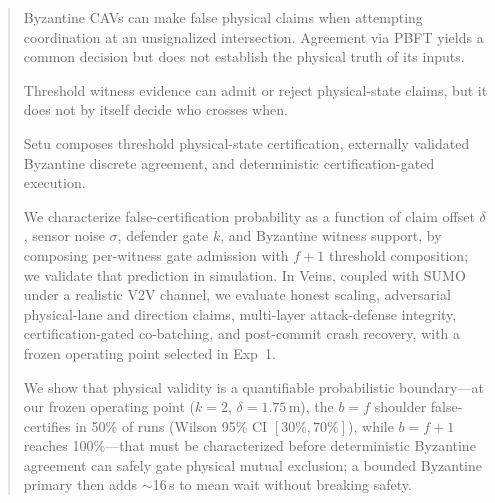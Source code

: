 \documentclass[letterpaper,10pt,conference]{IEEEtran}
\begin{document}
\begin{abstract}


Byzantine CAVs can make false physical claims when attempting coordination at an unsignalized intersection. Agreement via PBFT yields a common decision but does not
establish the physical truth of its inputs.

Threshold witness evidence can admit or reject physical-state claims,
but it does not by itself decide who crosses when.

Setu composes threshold physical-state certification, externally
validated Byzantine discrete agreement, and deterministic
certification-gated execution.

We characterize false-certification probability as a function of claim
offset $\delta$, sensor noise $\sigma$, defender gate $k$, and Byzantine
witness support, by composing per-witness gate admission with $f{+}1$
threshold composition; we validate that prediction in simulation.
In Veins, coupled with SUMO under a realistic V2V channel, we evaluate
honest scaling, adversarial physical-lane and direction claims,
multi-layer attack-defense integrity, certification-gated co-batching,
and post-commit crash recovery, with a frozen operating point selected
in Exp~1.

We show that physical validity is a quantifiable probabilistic
boundary---at our frozen operating point ($k{=}2$, $\delta{=}1.75$\,m),
the $b{=}f$ shoulder false-certifies in 50\% of runs (Wilson 95\% CI
$[30\%,70\%]$), while $b{=}f{+}1$ reaches 100\%---that must be
characterized before deterministic Byzantine agreement can safely gate
physical mutual exclusion; a bounded Byzantine primary then adds
$\sim$16\,s to mean wait without breaking safety.


\end{abstract}
\end{document}
